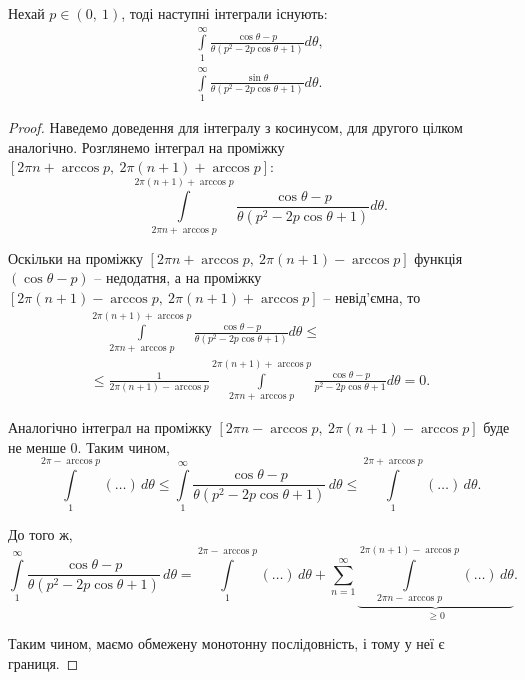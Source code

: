 \begin{corollary}
\label{lem:trig_bound}
Нехай $p \in (0,~1)$, тоді наступні інтеграли існують:
\begin{gather*}
	\int\limits_{1}^{\infty} \frac{\cos \theta - p}{\theta(p^2 - 2p\cos\theta + 1)} d \theta, \\
	\int\limits_{1}^{\infty} \frac{\sin \theta}{\theta(p^2 - 2p\cos\theta + 1)} d \theta.
\end{gather*}
\begin{proof}
	Наведемо доведення для інтегралу з косинусом, для другого цілком аналогічно. Розглянемо інтеграл на проміжку $[2\pi n + \arccos p,~2\pi (n + 1) + \arccos p]$:
	\begin{equation*}
		\int\limits_{2\pi n + \arccos p}^{2\pi (n + 1) + \arccos p} \frac{\cos \theta - p}{\theta(p^2 - 2p\cos\theta + 1)} d \theta.
	\end{equation*}
	
	Оскільки на проміжку $[2\pi n + \arccos p,~2\pi (n + 1) - \arccos p]$ функція $(\cos\theta - p)$ -- недодатня, а на проміжку $[2\pi (n + 1) - \arccos p,~2\pi (n + 1) + \arccos p]$ -- невід'ємна, то 
	\begin{gather*}
	\int\limits_{2\pi n + \arccos p}^{2\pi (n + 1) + \arccos p} \frac{\cos \theta - p}{\theta(p^2 - 2p\cos\theta + 1)} d \theta \leq \\
	\leq \frac{1}{2\pi (n + 1) - \arccos p} \int\limits_{2\pi n + \arccos p}^{2\pi (n + 1) + \arccos p} \frac{\cos \theta - p}{p^2 - 2p\cos\theta + 1} d \theta = 0.
	\end{gather*}
	
	Аналогічно інтеграл на проміжку $[2\pi n - \arccos p,~2\pi (n + 1) - \arccos p]$ буде не менше 0. Таким чином,
	\begin{equation*}
	\int\limits_{1}^{2\pi - \arccos p} (\dots) \,d\theta \leq \int\limits_{1}^{\infty} \frac{\cos \theta - p}{\theta(p^2 - 2p\cos\theta + 1)} \, d\theta \leq \int\limits_{1}^{2\pi + \arccos p} (\dots) \,d\theta.
	\end{equation*}
	
	До того ж,
	\begin{equation*}
	\int\limits_{1}^{\infty} \frac{\cos \theta - p}{\theta(p^2 - 2p\cos\theta + 1)} \, d\theta = \int\limits_{1}^{2\pi - \arccos p} (\dots) \,d\theta + \sum\limits_{n = 1}^{\infty} \underbrace{\int\limits_{2\pi n - \arccos p}^{2\pi (n + 1) - \arccos p} (\dots) \,d\theta}_{\geq 0}.
	\end{equation*}
	
	Таким чином, маємо обмежену монотонну послідовність, і тому у неї є границя.
\end{proof}
\end{corollary}

